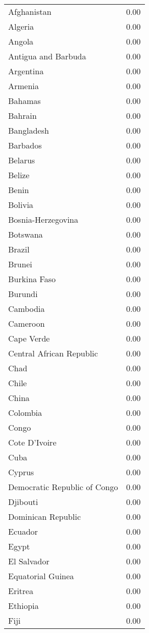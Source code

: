 \begin{table}[ht]
\begin{tabular}{lr}
  Afghanistan & 0.00 \\ 
  Algeria & 0.00 \\ 
  Angola & 0.00 \\ 
  Antigua and Barbuda & 0.00 \\ 
  Argentina & 0.00 \\ 
  Armenia & 0.00 \\ 
  Bahamas & 0.00 \\ 
  Bahrain & 0.00 \\ 
  Bangladesh & 0.00 \\ 
  Barbados & 0.00 \\ 
  Belarus & 0.00 \\ 
  Belize & 0.00 \\ 
  Benin & 0.00 \\ 
  Bolivia & 0.00 \\ 
  Bosnia-Herzegovina & 0.00 \\ 
  Botswana & 0.00 \\ 
  Brazil & 0.00 \\ 
  Brunei & 0.00 \\ 
  Burkina Faso & 0.00 \\ 
  Burundi & 0.00 \\ 
  Cambodia & 0.00 \\ 
  Cameroon & 0.00 \\ 
  Cape Verde & 0.00 \\ 
  Central African Republic & 0.00 \\ 
  Chad & 0.00 \\ 
  Chile & 0.00 \\ 
  China & 0.00 \\ 
  Colombia & 0.00 \\ 
  Congo & 0.00 \\ 
  Cote D'Ivoire & 0.00 \\ 
  Cuba & 0.00 \\ 
  Cyprus & 0.00 \\ 
  Democratic Republic of Congo & 0.00 \\ 
  Djibouti & 0.00 \\ 
  Dominican Republic & 0.00 \\ 
  Ecuador & 0.00 \\ 
  Egypt & 0.00 \\ 
  El Salvador & 0.00 \\ 
  Equatorial Guinea & 0.00 \\ 
  Eritrea & 0.00 \\ 
  Ethiopia & 0.00 \\ 
  Fiji & 0.00 \\ 

\end{tabular}
\end{table}
